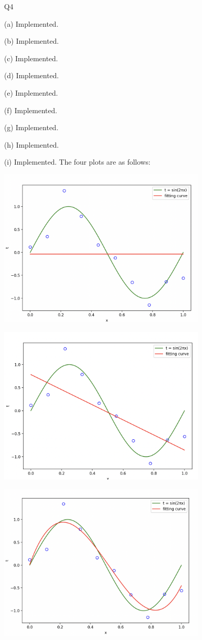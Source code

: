 \question Q4\droppoints

\begin{solution}
(a)
    Implemented.

    (b) Implemented.

    (c) Implemented.

    (d) Implemented.

    (e) Implemented.

    (f) Implemented.

    (g) Implemented.

    (h) Implemented.

    (i) Implemented.
    The four plots are as follows:

    \centerline{
        \includegraphics[width=0.75\textwidth]{img/1}
    }
    \centerline{
        \includegraphics[width=0.75\textwidth]{img/2}
    }
    \centerline{
        \includegraphics[width=0.75\textwidth]{img/3}
}
\end{solution}
